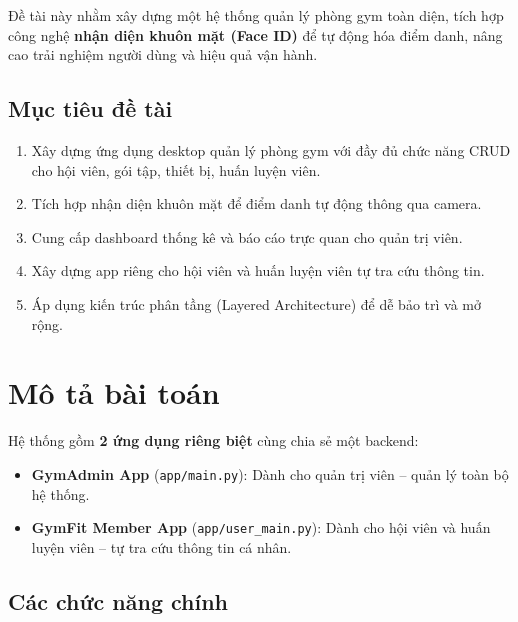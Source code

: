 \documentclass[12pt,a4paper]{article}
\begin{document}
Đề tài này nhằm xây dựng một hệ thống quản lý phòng gym toàn diện, tích hợp công nghệ \textbf{nhận diện khuôn mặt (Face ID)} để tự động hóa điểm danh, nâng cao trải nghiệm người dùng và hiệu quả vận hành.

\subsection{Mục tiêu đề tài}

\begin{enumerate}[leftmargin=2cm]
	\item Xây dựng ứng dụng desktop quản lý phòng gym với đầy đủ chức năng CRUD cho hội viên, gói tập, thiết bị, huấn luyện viên.
	\item Tích hợp nhận diện khuôn mặt để điểm danh tự động thông qua camera.
	\item Cung cấp dashboard thống kê và báo cáo trực quan cho quản trị viên.
	\item Xây dựng app riêng cho hội viên và huấn luyện viên tự tra cứu thông tin.
	\item Áp dụng kiến trúc phân tầng (Layered Architecture) để dễ bảo trì và mở rộng.
\end{enumerate}

\section{Mô tả bài toán}

Hệ thống gồm \textbf{2 ứng dụng riêng biệt} cùng chia sẻ một backend:

\begin{itemize}[leftmargin=2cm]
	\item \textbf{GymAdmin App} (\texttt{app/main.py}): Dành cho quản trị viên -- quản lý toàn bộ hệ thống.
	\item \textbf{GymFit Member App} (\texttt{app/user\_main.py}): Dành cho hội viên và huấn luyện viên -- tự tra cứu thông tin cá nhân.
\end{itemize}

\subsection{Các chức năng chính}
\end{document}
